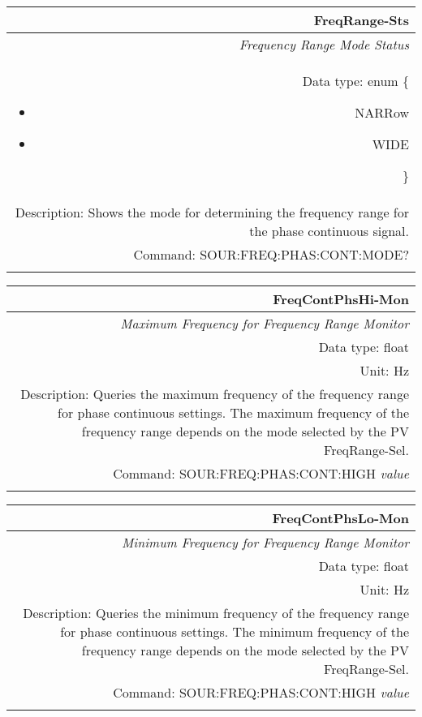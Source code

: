 \documentclass[openany]{article}
\begin{document}
		\begin{tabular}{N}
			\hline
			\bfseries FreqRange-Sts \\ \hline
			\emph{Frequency Range Mode Status} \\
			Data type: enum \{\begin{itemize}[noitemsep]
				\small
				\item[] NARRow
				\item[] WIDE
			\end{itemize}\} \\ 
			Description: Shows the mode for determining the frequency range for the phase continuous signal. \\
			Command: SOUR:FREQ:PHAS:CONT:MODE? \\
			\\

		\end{tabular}


		\begin{tabular}{N}
			\hline
			\bfseries FreqContPhsHi-Mon \\ \hline
			\emph{Maximum Frequency for Frequency Range Monitor} \\
			Data type: float \\
			Unit: Hz \\
			Description: Queries the maximum frequency of the frequency range for phase continuous settings. The maximum frequency of the frequency range depends on the mode selected by the PV FreqRange-Sel.\\
			Command: SOUR:FREQ:PHAS:CONT:HIGH \emph{value} \\
			\\
			
		\end{tabular}


		\begin{tabular}{N}
			\hline
			\bfseries FreqContPhsLo-Mon \\ \hline
			\emph{Minimum Frequency for Frequency Range Monitor} \\
			Data type: float \\
			Unit: Hz \\
			Description: Queries the minimum frequency of the frequency range for phase continuous settings. The minimum frequency of the frequency range depends on the mode selected by the PV FreqRange-Sel.\\
			Command: SOUR:FREQ:PHAS:CONT:HIGH \emph{value} \\
			\\
			
		\end{tabular}
\end{document}
